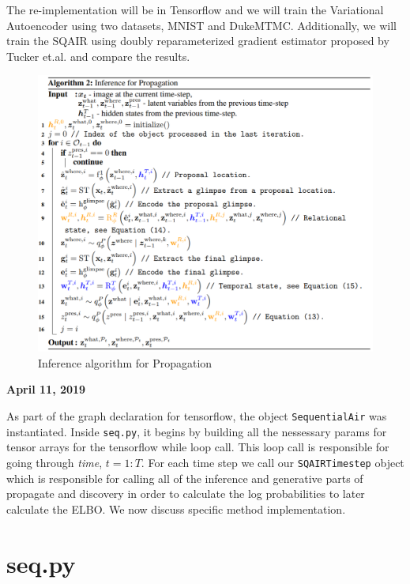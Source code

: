 \documentclass{article}
\begin{document}
The re-implementation will be in Tensorflow and we will train the Variational Autoencoder using two datasets, MNIST and DukeMTMC. Additionally, we will train the SQAIR using doubly reparameterized gradient estimator proposed by Tucker et.al. and compare the results. 


\begin{figure}[h]
\centering
\includegraphics[width=5in]{prop.png}
\caption{Inference algorithm for Propagation}
\label{fig:prop}
\end{figure}


\newpage

\textbf{April 11, 2019}

As part of the graph declaration for tensorflow, the object \texttt{SequentialAir} was instantiated. Inside \texttt{seq.py}, it begins by building all the nessessary params for tensor arrays for the tensorflow while loop call. This loop call is responsible for going through \textit{time}, $t=1:T$. For each time step we call our \texttt{SQAIRTimestep} object which is responsible for calling all of the inference and generative parts of propagate and discovery in order to calculate the log probabilities to later calculate the ELBO. We now discuss specific method implementation. 

\section{seq.py}
\end{document}
